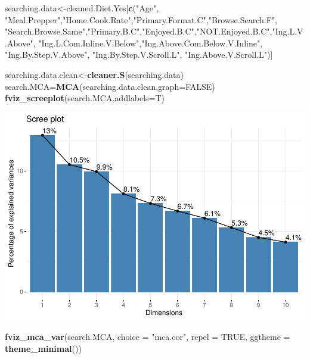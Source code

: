 \documentclass[
]{article}
\newenvironment{Shaded}{\begin{snugshade}}{\end{snugshade}}
\newcommand{\DataTypeTok}[1]{\textcolor[rgb]{0.13,0.29,0.53}{#1}}
\newcommand{\KeywordTok}[1]{\textcolor[rgb]{0.13,0.29,0.53}{\textbf{#1}}}
\newcommand{\NormalTok}[1]{#1}
\newcommand{\OtherTok}[1]{\textcolor[rgb]{0.56,0.35,0.01}{#1}}
\newcommand{\StringTok}[1]{\textcolor[rgb]{0.31,0.60,0.02}{#1}}
\begin{document}
\begin{Shaded}
\begin{Highlighting}[]
\NormalTok{searching.data<-cleaned.Diet.Yes[}\KeywordTok{c}\NormalTok{(}\StringTok{"Age"}\NormalTok{, }\StringTok{"Meal.Prepper"}\NormalTok{,}\StringTok{"Home.Cook.Rate"}\NormalTok{,}\StringTok{"Primary.Format.C"}\NormalTok{,}\StringTok{"Browse.Search.F"}\NormalTok{,}
            \StringTok{"Search.Browse.Same"}\NormalTok{,}\StringTok{"Primary.B.C"}\NormalTok{,}\StringTok{"Enjoyed.B.C"}\NormalTok{,}\StringTok{"NOT.Enjoyed.B.C"}\NormalTok{,}\StringTok{"Ing.L.V.Above"}\NormalTok{,}
            \StringTok{"Ing.L.Com.Inline.V.Below"}\NormalTok{,}\StringTok{"Ing.Above.Com.Below.V.Inline"}\NormalTok{,  }\StringTok{"Ing.By.Step.V.Above"}\NormalTok{,  }\StringTok{"Ing.By.Step.V.Scroll.L"}\NormalTok{,}
            \StringTok{"Ing.Above.V.Scroll.L"}\NormalTok{)]}

\NormalTok{searching.data.clean<-}\KeywordTok{cleaner.S}\NormalTok{(searching.data)}
\NormalTok{search.MCA=}\KeywordTok{MCA}\NormalTok{(searching.data.clean,}\DataTypeTok{graph=}\OtherTok{FALSE}\NormalTok{)}
\KeywordTok{fviz_screeplot}\NormalTok{(search.MCA,}\DataTypeTok{addlabels=}\NormalTok{T)}
\end{Highlighting}
\end{Shaded}

\includegraphics{Average-User-MCA_files/figure-latex/diet yes browse-1.pdf}

\begin{Shaded}
\begin{Highlighting}[]
\KeywordTok{fviz_mca_var}\NormalTok{(search.MCA, }\DataTypeTok{choice =} \StringTok{"mca.cor"}\NormalTok{, }\DataTypeTok{repel =} \OtherTok{TRUE}\NormalTok{,}
             \DataTypeTok{ggtheme =} \KeywordTok{theme_minimal}\NormalTok{())}
\end{Highlighting}
\end{Shaded}
\end{document}
